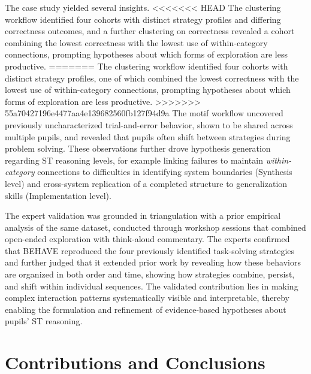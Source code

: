 The case study yielded several insights.
<<<<<<< HEAD
The clustering workflow identified four cohorts with distinct strategy profiles and differing correctness outcomes, and a further clustering on correctness revealed a cohort combining the lowest correctness with the lowest use of within-category connections, prompting hypotheses about which forms of exploration are less productive.
=======
The clustering workflow identified four cohorts with distinct strategy profiles, one of which combined the lowest correctness with the lowest use of within-category connections, prompting hypotheses about which forms of exploration are less productive.
>>>>>>> 55a70427196e4477aa4e139682560fb127f94d9a
The motif workflow uncovered previously uncharacterized trial-and-error behavior, shown to be shared across multiple pupils, and revealed that pupils often shift between strategies during problem solving.
These observations further drove hypothesis generation regarding ST reasoning levels, for example linking failures to maintain \textit{within-category} connections to difficulties in identifying system boundaries (Synthesis level) and cross-system replication of a completed structure to generalization skills (Implementation level).

The expert validation was grounded in triangulation with a prior empirical analysis of the same dataset, conducted through workshop sessions that combined open-ended exploration with think-aloud commentary.
The experts confirmed that \textsc{BEHAVE} reproduced the four previously identified task-solving strategies and further judged that it extended prior work by revealing how these behaviors are organized in both order and time, showing how strategies combine, persist, and shift within individual sequences.
The validated contribution lies in making complex interaction patterns systematically visible and interpretable, thereby enabling the formulation and refinement of evidence-based hypotheses about pupils' ST reasoning.





\section{Contributions and Conclusions}

